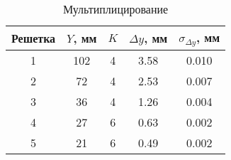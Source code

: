 \begin{table}[h!]
    \centering
    \begin{tabular}{|c|c|c|c|c|}
    \hline
    Решетка    & $Y$, мм & $K$ & $\Delta y$, мм & $\sigma_{\Delta y}$, мм \\ \hline
    1          & 102     & 4   & 3.58           & 0.010                   \\ \hline
    2          & 72      & 4   & 2.53           & 0.007                   \\ \hline
    3          & 36      & 4   & 1.26           & 0.004                   \\ \hline
    4          & 27      & 6   & 0.63           & 0.002                   \\ \hline
    5          & 21      & 6   & 0.49           & 0.002                   \\ \hline
    \end{tabular}
    \caption{Мультиплицирование}
    \label{table:multiplication}
\end{table}